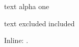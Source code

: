 \documentclass{article}
\begin{document}
\begin{lighter}{text}
alpha {one}
\end{lighter}

\begin{lighter}[2:]{text}
excluded
included
\end{lighter}


Inline: .
\end{document}
